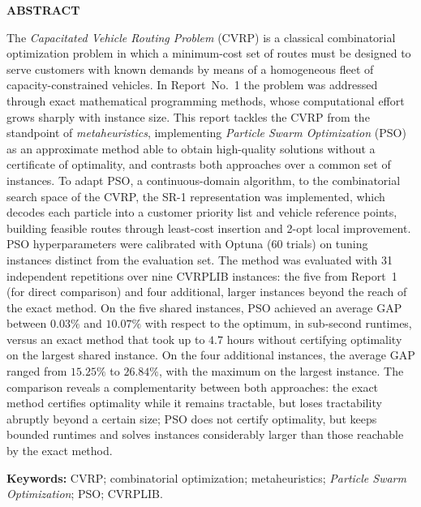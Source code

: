 \clearpage
\thispagestyle{empty}
\begin{center}
    \bfseries\fontsize{14}{16}\selectfont ABSTRACT
\end{center}
\vspace{16pt}

\noindent
The \textit{Capacitated Vehicle Routing Problem} (CVRP) is a classical combinatorial
optimization problem in which a minimum-cost set of routes must be designed to serve
customers with known demands by means of a homogeneous fleet of capacity-constrained
vehicles. In Report~No.~1 the problem was addressed through exact mathematical
programming methods, whose computational effort grows sharply with instance size. This
report tackles the CVRP from the standpoint of \textit{metaheuristics}, implementing
\textit{Particle Swarm Optimization} (PSO) as an approximate method able to obtain
high-quality solutions without a certificate of optimality, and contrasts both
approaches over a common set of instances. To adapt PSO, a continuous-domain
algorithm, to the combinatorial search space of the CVRP, the SR-1 representation
\parencite{ai2009particle} was implemented, which decodes each particle into a customer
priority list and vehicle reference points, building feasible routes through
least-cost insertion and 2-opt local improvement. PSO hyperparameters were calibrated
with Optuna (60 trials) on tuning instances distinct from the evaluation set. The
method was evaluated with 31 independent repetitions over nine CVRPLIB instances: the
five from Report~1 (for direct comparison) and four additional, larger instances beyond
the reach of the exact method. On the five shared instances, PSO achieved an average GAP
between $0.03\%$ and $10.07\%$ with respect to the optimum, in sub-second runtimes,
versus an exact method that took up to $4.7$ hours without certifying optimality on the
largest shared instance. On the four additional instances, the average GAP ranged from
$15.25\%$ to $26.84\%$, with the maximum on the largest instance. The comparison reveals
a complementarity between
both approaches: the exact method certifies optimality while it remains tractable, but
loses tractability abruptly beyond a certain size; PSO does not certify optimality, but
keeps bounded runtimes and solves instances considerably larger than those reachable by
the exact method.

\vspace{10pt}
\noindent\textbf{Keywords:} CVRP; combinatorial optimization; metaheuristics;
\textit{Particle Swarm Optimization}; PSO; CVRPLIB.
